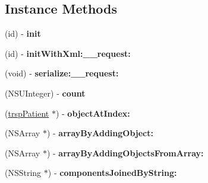 \subsection*{Instance Methods}
\begin{DoxyCompactItemize}
\item 
\hypertarget{interfaceget_patients_response_acf93927d295fbc04a6f569aace949c7a}{}(id) -\/ {\bfseries init}\label{interfaceget_patients_response_acf93927d295fbc04a6f569aace949c7a}

\item 
\hypertarget{interfaceget_patients_response_a68be104889803585808d8601e477a8e5}{}(id) -\/ {\bfseries init\+With\+Xml\+:\+\_\+\+\_\+request\+:}\label{interfaceget_patients_response_a68be104889803585808d8601e477a8e5}

\item 
\hypertarget{interfaceget_patients_response_affa70b9b8453b2652d9e706469b4cebb}{}(void) -\/ {\bfseries serialize\+:\+\_\+\+\_\+request\+:}\label{interfaceget_patients_response_affa70b9b8453b2652d9e706469b4cebb}

\item 
\hypertarget{interfaceget_patients_response_abfb98551f31a52de753bcdc1ef648662}{}(N\+S\+U\+Integer) -\/ {\bfseries count}\label{interfaceget_patients_response_abfb98551f31a52de753bcdc1ef648662}

\item 
\hypertarget{interfaceget_patients_response_ad60eec2e33f5bbd40e8ca0454e2e0d5d}{}(\hyperlink{interfacetrsp_patient}{trsp\+Patient} $\ast$) -\/ {\bfseries object\+At\+Index\+:}\label{interfaceget_patients_response_ad60eec2e33f5bbd40e8ca0454e2e0d5d}

\item 
\hypertarget{interfaceget_patients_response_aaf2bdfb62b12dd4015b30131e3fd4d10}{}(N\+S\+Array $\ast$) -\/ {\bfseries array\+By\+Adding\+Object\+:}\label{interfaceget_patients_response_aaf2bdfb62b12dd4015b30131e3fd4d10}

\item 
\hypertarget{interfaceget_patients_response_a009b94c3dd63745ef15ada8111e9253a}{}(N\+S\+Array $\ast$) -\/ {\bfseries array\+By\+Adding\+Objects\+From\+Array\+:}\label{interfaceget_patients_response_a009b94c3dd63745ef15ada8111e9253a}

\item 
\hypertarget{interfaceget_patients_response_a2e9abcde02e1bf15188ff39b228eb64b}{}(N\+S\+String $\ast$) -\/ {\bfseries components\+Joined\+By\+String\+:}\label{interfaceget_patients_response_a2e9abcde02e1bf15188ff39b228eb64b}


\end{DoxyCompactItemize}
